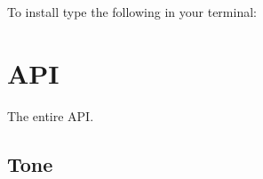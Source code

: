 \documentclass[letterpaper,10pt,english]{sphinxmanual}
\begin{document}
To install  type the following in your terminal:

\begin{sphinxVerbatim}[commandchars=\\\{\}]
  
\end{sphinxVerbatim}


\section{API}
\label{\detokenize{api:api}}\label{\detokenize{api::doc}}
The entire  API.


\subsection{Tone}
\label{\detokenize{api:tone}}
\end{document}
